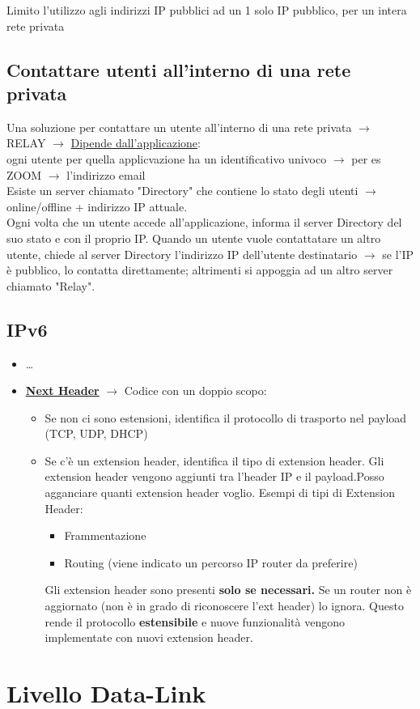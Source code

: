 \documentclass[a4paper]{article}
\begin{document}
 Limito l'utilizzo agli indirizzi IP pubblici ad un
 1 solo IP pubblico, per un intera rete privata


\subsection{Contattare utenti all'interno di una rete privata}
Una soluzione per contattare un utente all'interno di una rete privata $\rightarrow$ RELAY
$\rightarrow$ \underline{Dipende dall'applicazione}:\\
\indent 
ogni utente per quella applicvazione ha un identificativo univoco $\rightarrow$ per es ZOOM $\rightarrow$ l'indirizzo email
\\
\noindent
Esiste un server chiamato "Directory" che contiene lo stato degli utenti $\rightarrow$ online/offline + indirizzo IP attuale.
\\ 
Ogni volta che un utente accede all'applicazione, informa il server Directory del suo stato e con il proprio IP. 
Quando un utente vuole contattatare un altro utente, chiede al server Directory l'indirizzo IP dell'utente destinatario $\rightarrow$ se l'IP è pubblico, 
lo contatta direttamente; altrimenti si appoggia ad un altro server chiamato "Relay". 

\subsection{IPv6}

\begin{itemize}
  \item \dots
  \item \textbf{\underline{Next Header}} $\rightarrow$ Codice con un doppio scopo:
  \begin{itemize}
    \item Se non ci sono estensioni, identifica il protocollo di trasporto nel payload (TCP, UDP, DHCP)
    \item Se c'è un extension header, identifica il tipo di extension header. Gli extension header vengono aggiunti tra l'header IP e il payload.Posso agganciare quanti extension header voglio.
    Esempi di tipi di Extension Header:
    \begin{itemize}
      \item Frammentazione
      \item Routing (viene indicato un percorso IP router da preferire)
    \end{itemize}
  Gli extension header sono presenti \textbf{solo se necessari.} Se un router non è aggiornato
  (non è in grado di riconoscere l'ext header) lo ignora. Questo rende il protocollo \textbf{estensibile} e nuove 
  funzionalità vengono implementate con nuovi extension header.
  \end{itemize}
\end{itemize}

\pagebreak

\section{Livello Data-Link}
\end{document}

